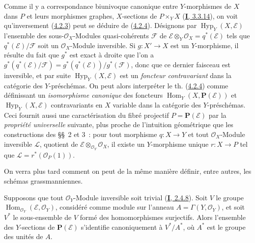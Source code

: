 \begin{remark}[4.2.5]
\label{II.4.2.5-fr}
Comme il y a correspondance biunivoque canonique entre $Y$-morphismes de $X$
dans $P$ et leurs morphismes graphes, $X$-sections de $P\times_YX$
(\hyperref[I.3.3.14-fr]{\textbf{I}, 3.3.14}), on voit qu'inversement
(\hyperref[II.4.2.3-fr]{4.2.3}) peut se déduire de
(\hyperref[II.4.2.4-fr]{4.2.4}). Désignons par
$\operatorname{Hyp}_Y(X,\mathcal{E})$ l'ensemble des
sous-$\mathcal{O}_X$-Modules quasi-cohérents $\mathcal{F}$ de
$\mathcal{E}\otimes_Y\mathcal{O}_X=q^*(\mathcal{E})$ tels que
$q^*(\mathcal{E})/\mathcal{F}$ soit un $\mathcal{O}_X$-Module inversible. Si
$g:X'\to X$ est un $Y$-morphisme, il résulte du fait que $g^*$ est exact à
droite que l'on a
$g^*(q^*(\mathcal{E})/\mathcal{F})=g^*(q^*(\mathcal{E}))/g^*(\mathcal{F})$,
donc que ce dernier faisceau est inversible, et par suite
$\operatorname{Hyp}_Y(X,\mathcal{E})$ est un \emph{foncteur contravariant} dans la
catégorie des $Y$-préschémas. On peut alors interpréter le th.
(\hyperref[II.4.2.4-fr]{4.2.4}) comme définissant un \emph{isomorphisme canonique}
des foncteurs $\operatorname{Hom}_Y(X,\mathbf{P}(\mathcal{E}))$ et
$\operatorname{Hyp}_Y(X,\mathcal{E})$ contravariants en $X$ variable dans la
catégorie des $Y$-préschémas. Ceci fournit aussi une caractérisation du fibré
projectif $P=\mathbf{P}(\mathcal{E})$ par la \emph{propriété universelle} suivante,
plus proche de l'intuition géométrique que les constructions des \S\S~2 et
3~: pour tout morphisme $q:X\to Y$ et tout $\mathcal{O}_X$-Module inversible
$\mathcal{L}$, quotient de $\mathcal{E}\otimes_{\mathcal{O}_Y}\mathcal{O}_X$,
il existe un $Y$-morphisme unique $r:X\to P$ tel que
$\mathcal{L}=r^*(\mathcal{O}_P(1))$.

On verra plus tard comment on peut de la même manière définir, entre autres,
les schémas \og grassmanniennes\fg{}.
\end{remark}

\begin{corollary}[4.2.6]
\label{II.4.2.6-fr}
Supposons que tout $\mathcal{O}_Y$-Module inversible soit trivial
\textup{(\hyperref[I.2.4.8-fr]{\textbf{I}, 2.4.8})}. Soit $V$ le groupe
$\operatorname{Hom}_{\mathcal{O}_Y}(\mathcal{E},\mathcal{O}_Y)$, considéré
comme module sur l'anneau $A=\Gamma(Y,\mathcal{O}_Y)$, et soit $V^*$ le
sous-ensemble de $V$ formé des homomorphismes surjectifs. Alors l'ensemble
des $Y$-sections de $\mathbf{P}(\mathcal{E})$ s'identifie canoniquement à
$V^*/A^*$, où $A^*$ est le groupe des unités de $A$.
\end{corollary}

